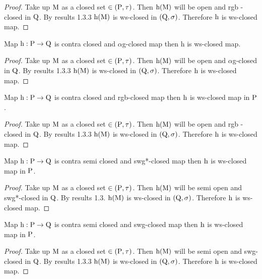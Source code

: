 \begin{proof}
Take up $\mathrm{M}$ as a closed set $\in (\mathrm{P}, \tau)$. Then $\mathrm{h} (\mathrm{M})$ will be open and rgb - closed in $\mathrm{Q}$. By results 1.3.3 $\mathrm{h} (\mathrm{M})$ is ws-closed in $(\mathrm{Q}, \sigma)$. Therefore $\mathrm{h}$ is ws-closed map.
\end{proof}

\begin{thm}\label{thm4.2.17}
Map $\mathrm{h}: \mathrm{P} \to \mathrm{Q}$ is contra closed and $\alpha$g-closed map then h is ws-closed map.
\end{thm}

\begin{proof}
Take up $\mathrm{M}$ as a closed set $\in (\mathrm{P}, \tau)$. Then $\mathrm{h} (\mathrm{M})$ will be open and $\alpha$g-closed in $\mathrm{Q}$. By results 1.3.3 $\mathrm{h} (\mathrm{M})$ is ws-closed in $(\mathrm{Q}, \sigma)$. Therefore $\mathrm{h}$ is ws-closed map.
\end{proof}

\begin{thm}\label{thm4.2.18}
Map $\mathrm{h}: \mathrm{P} \to \mathrm{Q}$ is contra closed and rgb-closed map then $\mathrm{h}$ is ws-closed map in $\mathrm{P}$.
\end{thm}

\begin{proof}
Take up $\mathrm{M}$ as a closed set $\in (\mathrm{P}, \tau)$. Then $\mathrm{h} (\mathrm{M})$ will be open and rgb - closed in $\mathrm{Q}$. By results 1.3.3 $\mathrm{h}(\mathrm{M})$ is ws-closed in $(\mathrm{Q}, \sigma)$. Therefore $\mathrm{h}$ is ws-closed map.
\end{proof}

\begin{thm}\label{thm4.2.19}
Map $\mathrm{h}: \mathrm{P} \to \mathrm{Q}$ is contra semi closed and swg*-closed map then $\mathrm{h}$ is ws-closed map in $\mathrm{P}$.
\end{thm}

\begin{proof}
Take up $\mathrm{M}$ as a closed set $\in (\mathrm{P}, \tau)$. Then $\mathrm{h} (\mathrm{M})$ will be semi open and swg*-closed in $\mathrm{Q}$. By results 1.3. $\mathrm{h}(\mathrm{M})$ is ws-closed in $(\mathrm{Q}, \sigma)$. Therefore $\mathrm{h}$ is ws-closed map.
\end{proof}

\begin{thm}\label{thm4.2.20}
Map $\mathrm{h}: \mathrm{P} \to \mathrm{Q}$ is contra semi closed and swg-closed map then $\mathrm{h}$ is ws-closed map in $\mathrm{P}$.
\end{thm}

\begin{proof}
Take up $\mathrm{M}$ as a closed set $\in (\mathrm{P}, \tau)$. Then $\mathrm{h} (\mathrm{M})$ will be semi open and swg-closed in $\mathrm{Q}$. By results 1.3.3 $\mathrm{h} (\mathrm{M})$ is ws-closed in $(\mathrm{Q}, \sigma)$. Therefore $\mathrm{h}$ is ws-closed map.
\end{proof}

